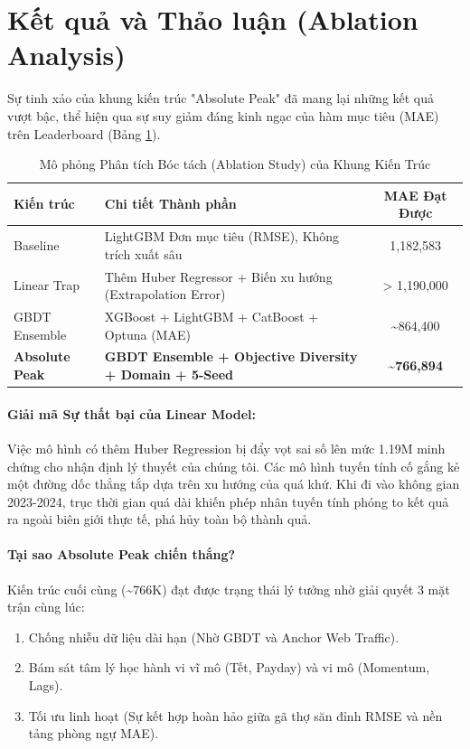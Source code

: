 \documentclass{article}
\begin{document}
\section{Kết quả và Thảo luận (Ablation Analysis)}

Sự tinh xảo của khung kiến trúc "Absolute Peak" đã mang lại những kết quả vượt bậc, thể hiện qua sự suy giảm đáng kinh ngạc của hàm mục tiêu (MAE) trên Leaderboard (Bảng \ref{tab:ablation}).

\begin{table}[H]
  \caption{Mô phỏng Phân tích Bóc tách (Ablation Study) của Khung Kiến Trúc}
  \label{tab:ablation}
  \centering
  \begin{tabular}{llc}
    \toprule
    \textbf{Kiến trúc} & \textbf{Chi tiết Thành phần} & \textbf{MAE Đạt Được} \\
    \midrule
    Baseline & LightGBM Đơn mục tiêu (RMSE), Không trích xuất sâu & 1,182,583 \\
    \midrule
    Linear Trap & Thêm Huber Regressor + Biến xu hướng (Extrapolation Error) & > 1,190,000 \\
    \midrule
    GBDT Ensemble & XGBoost + LightGBM + CatBoost + Optuna (MAE) & \textasciitilde 864,400 \\
    \midrule
    \textbf{Absolute Peak} & \textbf{GBDT Ensemble + Objective Diversity + Domain + 5-Seed} & \textbf{\textasciitilde 766,894} \\
    \bottomrule
  \end{tabular}
\end{table}

\paragraph{Giải mã Sự thất bại của Linear Model:} Việc mô hình có thêm Huber Regression bị đẩy vọt sai số lên mức 1.19M minh chứng cho nhận định lý thuyết của chúng tôi. Các mô hình tuyến tính cố gắng kẻ một đường dốc thẳng tắp dựa trên xu hướng của quá khứ. Khi đi vào không gian 2023-2024, trục thời gian quá dài khiến phép nhân tuyến tính phóng to kết quả ra ngoài biên giới thực tế, phá hủy toàn bộ thành quả.

\paragraph{Tại sao Absolute Peak chiến thắng?} 
Kiến trúc cuối cùng (\textasciitilde 766K) đạt được trạng thái lý tưởng nhờ giải quyết 3 mặt trận cùng lúc:
\begin{enumerate}
    \item Chống nhiễu dữ liệu dài hạn (Nhờ GBDT và Anchor Web Traffic).
    \item Bám sát tâm lý học hành vi vĩ mô (Tết, Payday) và vi mô (Momentum, Lags).
    \item Tối ưu linh hoạt (Sự kết hợp hoàn hảo giữa gã thợ săn đỉnh RMSE và nền tảng phòng ngự MAE).
\end{enumerate}
\end{document}
